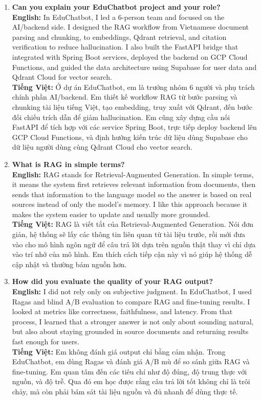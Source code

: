\documentclass[11pt,a4paper]{article}
\begin{document}
\begin{enumerate}[leftmargin=*, itemsep=10pt]
\item \textbf{Can you explain your EduChatbot project and your role?}\\
\textbf{English:} In EduChatbot, I led a 6-person team and focused on the AI/backend side. I designed the RAG workflow from Vietnamese document parsing and chunking, to embeddings, Qdrant retrieval, and citation verification to reduce hallucination. I also built the FastAPI bridge that integrated with Spring Boot services, deployed the backend on GCP Cloud Functions, and guided the data architecture using Supabase for user data and Qdrant Cloud for vector search.\\
\textbf{Tiếng Việt:} Ở dự án EduChatbot, em là trưởng nhóm 6 người và phụ trách chính phần AI/backend. Em thiết kế workflow RAG từ bước parsing và chunking tài liệu tiếng Việt, tạo embedding, truy xuất với Qdrant, đến bước đối chiếu trích dẫn để giảm hallucination. Em cũng xây dựng cầu nối FastAPI để tích hợp với các service Spring Boot, trực tiếp deploy backend lên GCP Cloud Functions, và định hướng kiến trúc dữ liệu dùng Supabase cho dữ liệu người dùng cùng Qdrant Cloud cho vector search.

\item \textbf{What is RAG in simple terms?}\\
\textbf{English:} RAG stands for Retrieval-Augmented Generation. In simple terms, it means the system first retrieves relevant information from documents, then sends that information to the language model so the answer is based on real sources instead of only the model's memory. I like this approach because it makes the system easier to update and usually more grounded.\\
\textbf{Tiếng Việt:} RAG là viết tắt của Retrieval-Augmented Generation. Nói đơn giản, hệ thống sẽ lấy các thông tin liên quan từ tài liệu trước, rồi mới đưa vào cho mô hình ngôn ngữ để câu trả lời dựa trên nguồn thật thay vì chỉ dựa vào trí nhớ của mô hình. Em thích cách tiếp cận này vì nó giúp hệ thống dễ cập nhật và thường bám nguồn hơn.

\item \textbf{How did you evaluate the quality of your RAG output?}\\
\textbf{English:} I did not rely only on subjective judgment. In EduChatbot, I used Ragas and blind A/B evaluation to compare RAG and fine-tuning results. I looked at metrics like correctness, faithfulness, and latency. From that process, I learned that a stronger answer is not only about sounding natural, but also about staying grounded in source documents and returning results fast enough for users.\\
\textbf{Tiếng Việt:} Em không đánh giá output chỉ bằng cảm nhận. Trong EduChatbot, em dùng Ragas và đánh giá A/B mù để so sánh giữa RAG và fine-tuning. Em quan tâm đến các tiêu chí như độ đúng, độ trung thực với nguồn, và độ trễ. Qua đó em học được rằng câu trả lời tốt không chỉ là trôi chảy, mà còn phải bám sát tài liệu nguồn và đủ nhanh để dùng thực tế.


\end{enumerate}
\end{document}
